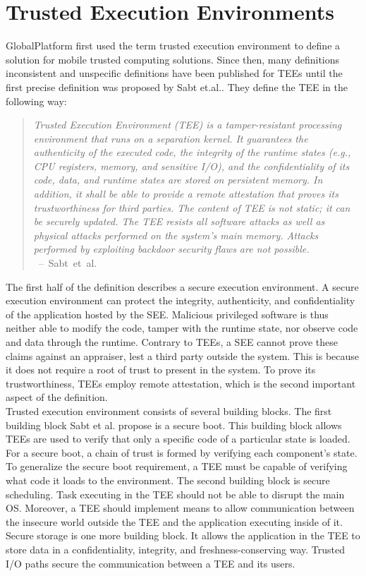 \section{Trusted Execution Environments}
\label{sec:state:tee}
GlobalPlatform first used the term trusted execution environment to define a
solution for mobile trusted computing solutions.\cite{globaltee} Since then,
many definitions inconsistent and unspecific definitions have been published for
TEEs until the first precise definition was proposed by Sabt
et.al.\cite{sabt2015trusted}. They define the TEE in the following way:
\begin{quote}
    \textit{Trusted Execution Environment (TEE) is a tamper-resistant processing
        environment that runs on a separation kernel. It guarantees the authenticity of
        the executed code, the integrity of the runtime states (e.g., CPU registers,
        memory, and sensitive I/O), and the confidentiality of its code, data, and
        runtime states are stored on persistent memory. In addition, it shall be able
        to provide a remote attestation that proves its trustworthiness for third
        parties. The content of TEE is not static; it can be securely updated. The TEE
        resists all software attacks as well as physical attacks performed on the
        system's main memory. Attacks performed by exploiting backdoor security flaws
        are not possible. \\
    } \mbox{ -- Sabt et al.\cite{sabt2015trusted}}
\end{quote}

The first half of the definition describes a secure execution environment. A
secure execution environment can protect the integrity, authenticity, and
confidentiality of the application hosted by the SEE. Malicious privileged
software is thus neither able to modify the code, tamper with the runtime state,
nor observe code and data through the runtime. Contrary to TEEs, a SEE cannot
prove these claims against an appraiser, lest a third party outside the system.
This is because it does not require a root of trust to present in the system. To
prove its trustworthiness, TEEs employ remote attestation, which is the second
important aspect of the definition.\\

Trusted execution environment consists of several building blocks. The first
building block Sabt et al. propose is a secure boot. This building block allows
TEEs are used to verify that only a specific code of a particular state is
loaded. For a secure boot, a chain of trust is formed by verifying each
component's state. To generalize the secure boot requirement, a TEE must be
capable of verifying what code it loads to the environment. The second building
block is secure scheduling. Task executing in the TEE should not be able to
disrupt the main OS. Moreover, a TEE should implement means to allow
communication between the insecure world outside the TEE and the application
executing inside of it. Secure storage is one more building block. It allows the
application in the TEE to store data in a confidentiality, integrity, and
freshness-conserving way. Trusted I/O paths secure the communication between a
TEE and its users.\\

